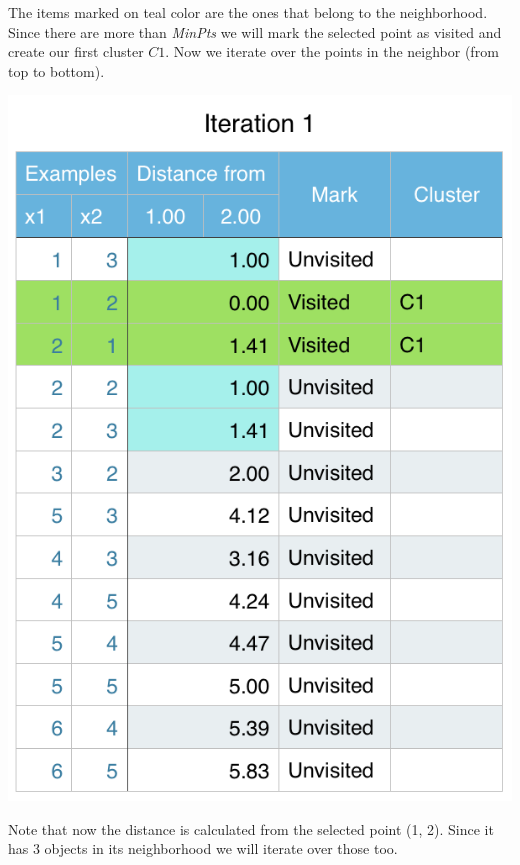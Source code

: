 \documentclass[11pt]{article}
\begin{document}
The items marked on teal color are the ones that belong to the neighborhood. Since there are more than \textit{MinPts} we will mark the selected point as visited and create our first cluster $C1$. Now we iterate over the points in the neighbor (from top to bottom).

\begin{center}
\includegraphics[scale=0.60]{dbscan-iter1.png}
\end{center}

Note that now the distance is calculated from the selected point (1, 2). Since it has 3 objects in its neighborhood we will iterate over those too. 
\end{document}
